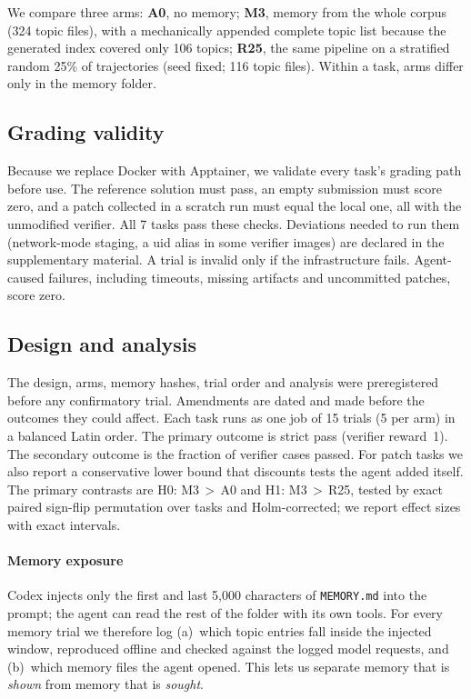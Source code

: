 We compare three arms:
\textbf{A0}, no memory;
\textbf{M3}, memory from the whole corpus (324 topic files), with a mechanically appended complete topic list because the generated index covered only 106 topics;
\textbf{R25}, the same pipeline on a stratified random 25\% of trajectories (seed fixed; 116 topic files).
Within a task, arms differ only in the memory folder.

\subsection{Grading validity}
Because we replace Docker with Apptainer, we validate every task's grading path before use.
The reference solution must pass, an empty submission must score zero, and a patch collected in a scratch run must equal the local one, all with the unmodified verifier.
All 7 tasks pass these checks.
Deviations needed to run them (network-mode staging, a uid alias in some verifier images) are declared in the supplementary material.
A trial is invalid only if the infrastructure fails.
Agent-caused failures, including timeouts, missing artifacts and uncommitted patches, score zero.

\subsection{Design and analysis}
The design, arms, memory hashes, trial order and analysis were preregistered before any confirmatory trial.
Amendments are dated and made before the outcomes they could affect.
Each task runs as one job of 15 trials (5 per arm) in a balanced Latin order.
The primary outcome is strict pass (verifier reward~1).
The secondary outcome is the fraction of verifier cases passed.
For patch tasks we also report a conservative lower bound that discounts tests the agent added itself.
The primary contrasts are H0: M3\,$>$\,A0 and H1: M3\,$>$\,R25, tested by exact paired sign-flip permutation over tasks and Holm-corrected; we report effect sizes with exact intervals.

\paragraph{Memory exposure}
Codex injects only the first and last 5{,}000 characters of \texttt{MEMORY.md} into the prompt; the agent can read the rest of the folder with its own tools.
For every memory trial we therefore log (a)~which topic entries fall inside the injected window, reproduced offline and checked against the logged model requests, and (b)~which memory files the agent opened.
This lets us separate memory that is \emph{shown} from memory that is \emph{sought}.

